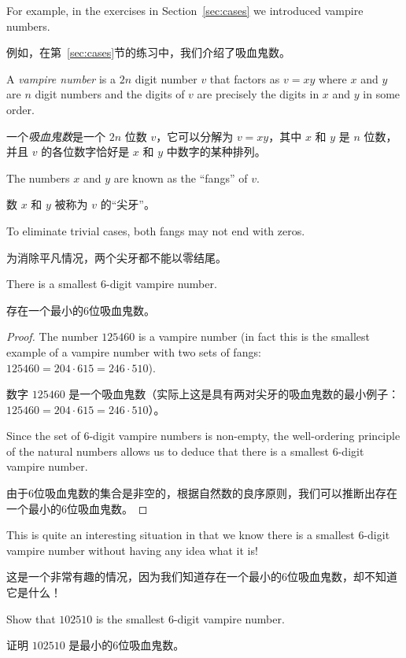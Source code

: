 For example, in the exercises in Section~\ref{sec:cases} we 
introduced vampire numbers.

例如，在第~\ref{sec:cases}节的练习中，我们介绍了吸血鬼数。

A  \emph{vampire number} 
is a 
$2n$ digit number $v$ that factors as $v=xy$
where $x$ and $y$ are $n$ digit numbers and the digits of $v$ are precisely the digits in $x$ and $y$ in some order.

一个\emph{吸血鬼数}是一个 $2n$ 位数 $v$，它可以分解为 $v=xy$，其中 $x$ 和 $y$ 是 $n$ 位数，并且 $v$ 的各位数字恰好是 $x$ 和 $y$ 中数字的某种排列。

The numbers $x$ and $y$
are known as the ``fangs'' of $v$.

数 $x$ 和 $y$ 被称为 $v$ 的“尖牙”。

To eliminate trivial
cases, both fangs may not end with zeros.  

为消除平凡情况，两个尖牙都不能以零结尾。


\begin{thm}
There is a smallest 6-digit vampire number.

存在一个最小的6位吸血鬼数。
\end{thm}

\begin{proof}
The number $125460$ is a vampire number (in fact this is the smallest
example of a vampire number with two sets of fangs: 
$125460 = 204\cdot 615 = 246\cdot 510$).

数字 $125460$ 是一个吸血鬼数（实际上这是具有两对尖牙的吸血鬼数的最小例子：$125460 = 204\cdot 615 = 246\cdot 510$）。

Since the set of 6-digit vampire
numbers is non-empty, the well-ordering principle of the natural numbers
allows us to deduce that there is a smallest 6-digit vampire number.

由于6位吸血鬼数的集合是非空的，根据自然数的良序原则，我们可以推断出存在一个最小的6位吸血鬼数。
\end{proof} 
 
This is quite an interesting situation in that we know there is a smallest
6-digit vampire number without having any idea what it is!

这是一个非常有趣的情况，因为我们知道存在一个最小的6位吸血鬼数，却不知道它是什么！

\begin{exer}
Show that $102510$ is the smallest 6-digit vampire number.

证明 $102510$ 是最小的6位吸血鬼数。
\end{exer}

